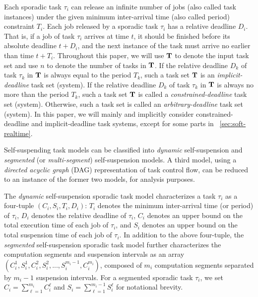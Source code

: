 \label{sec:model}


Each sporadic task $\tau_i$ can release an infinite number of jobs (also called task instances) under the given minimum inter-arrival time (also called period) constraint $T_i$.  Each job released by a sporadic task $\tau_i$ has a relative deadline $D_i$.  That is, if a job of task $\tau_i$ arrives at time $t$, it should be finished before its absolute deadline $t+D_i$, and the next instance of the task must arrive no earlier than time $t + T_i$.
Throughout this paper, we will use ${\bf T}$ to denote the input task
set and use $n$ to denote the number of tasks in ${\bf T}$. 
If the relative deadline $D_k$ of task $\tau_k$ in ${\bf T}$ is always
equal to the period $T_k$, such a task set ${\bf T}$ is an
\emph{implicit-deadline} task set (system). If the relative deadline $D_k$ of
task $\tau_k$ in ${\bf T}$ is always no more than the period $T_k$,
such a task set ${\bf T}$ is called a \emph{constrained-deadline} task
set (system). Otherwise, such a task set is called an \emph{arbitrary-deadline}
task set (system). In this paper, we will mainly and implicitly 
consider constrained-deadline and
implicit-deadline task systems, except for some parts in
\mysectionref{}~\ref{sec:soft-realtime}.
  
Self-suspending task models can be classified into \emph{dynamic} self-suspension and \emph{segmented} (or \emph{multi-segment})
self-suspension models. A third model, using a \emph{directed acyclic graph} (DAG) representation of task control flow, can be 
reduced to an instance of the former two models, for analysis purposes.

The \emph{dynamic} self-suspension sporadic task model characterizes a task $\tau_i$ as a four-tuple $(C_i,S_i,T_i,D_i)$: $T_i$ denotes the 
minimum inter-arrival time (or period) of $\tau_i$, $D_i$ denotes the relative deadline of $\tau_i$, $C_i$ denotes an upper bound on 
the total execution time of each job of $\tau_i$, and $S_i$ denotes an upper bound on the total suspension time of each job of $\tau_i$.  
In addition to the above four-tuple, the \emph{segmented} self-suspension sporadic task model further characterizes the computation segments and suspension 
intervals as an array $(C_{i}^1,S_{i}^1,C_{i}^2,S_{i}^2,...,S_{i}^{m_i-1},C_{i}^{m_i})$, composed of $m_i$ computation segments 
separated by $m_i-1$ suspension intervals.  For a segmented sporadic task $\tau_i$, we set 
$C_i = \sum_{\ell=1}^{m_i} C_i^\ell$ and $S_i=\sum_{\ell=1}^{m_i-1} S_i^\ell$ for notational brevity.

